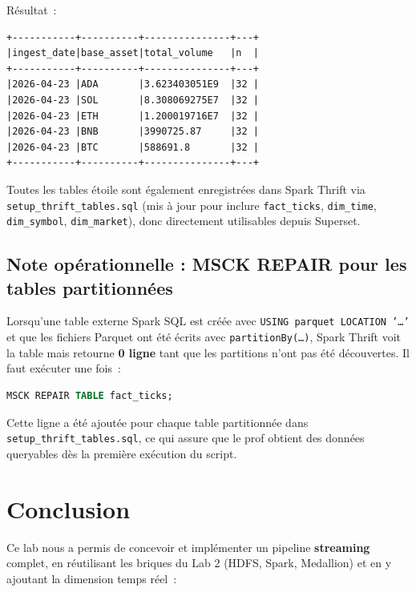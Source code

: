 \documentclass{RapportINPTCLOUD}
\begin{document}
R\'{e}sultat~:
\begin{lstlisting}[style=code]
+-----------+----------+---------------+---+
|ingest_date|base_asset|total_volume   |n  |
+-----------+----------+---------------+---+
|2026-04-23 |ADA       |3.623403051E9  |32 |
|2026-04-23 |SOL       |8.308069275E7  |32 |
|2026-04-23 |ETH       |1.200019716E7  |32 |
|2026-04-23 |BNB       |3990725.87     |32 |
|2026-04-23 |BTC       |588691.8       |32 |
+-----------+----------+---------------+---+
\end{lstlisting}

Toutes les tables \'{e}toile sont \'{e}galement enregistr\'{e}es dans Spark Thrift via \texttt{setup\_thrift\_tables.sql} (mis \`{a} jour pour inclure \texttt{fact\_ticks}, \texttt{dim\_time}, \texttt{dim\_symbol}, \texttt{dim\_market}), donc directement utilisables depuis Superset.

\subsection{Note op\'{e}rationnelle : MSCK REPAIR pour les tables partitionn\'{e}es}

Lorsqu'une table externe Spark SQL est cr\'{e}\'{e}e avec \texttt{USING parquet LOCATION '\dots'} et que les fichiers Parquet ont \'{e}t\'{e} \'{e}crits avec \texttt{partitionBy(\dots)}, Spark Thrift voit la table mais retourne \textbf{0 ligne} tant que les partitions n'ont pas \'{e}t\'{e} d\'{e}couvertes. Il faut ex\'{e}cuter une fois~:

\begin{lstlisting}[style=code, language=SQL]
MSCK REPAIR TABLE fact_ticks;
\end{lstlisting}

Cette ligne a \'{e}t\'{e} ajout\'{e}e pour chaque table partitionn\'{e}e dans \texttt{setup\_thrift\_tables.sql}, ce qui assure que le prof obtient des donn\'{e}es queryables d\`{e}s la premi\`{e}re ex\'{e}cution du script.

\section{Conclusion}

Ce lab nous a permis de concevoir et impl\'{e}menter un pipeline \textbf{streaming} complet, en r\'{e}utilisant les briques du Lab 2 (HDFS, Spark, Medallion) et en y ajoutant la dimension temps r\'{e}el~:
\end{document}
